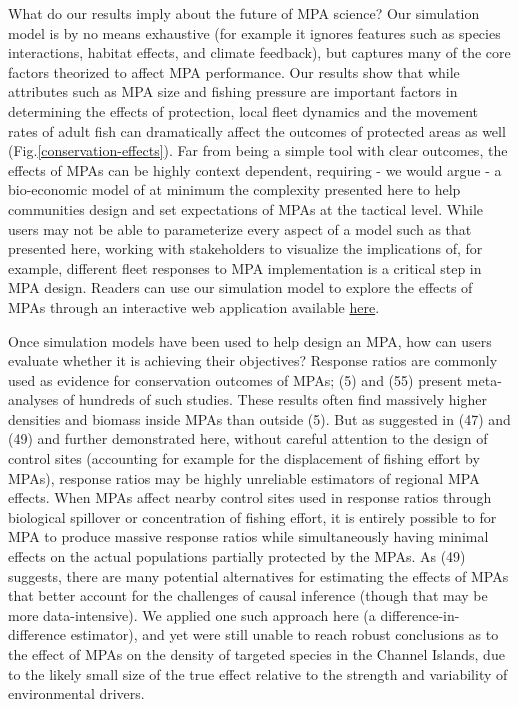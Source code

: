 \documentclass[9pt,twocolumn,twoside,lineno]{pnas-new}
\begin{document}
What do our results imply about the future of MPA science? Our
simulation model is by no means exhaustive (for example it ignores
features such as species interactions, habitat effects, and climate
feedback), but captures many of the core factors theorized to affect MPA
performance. Our results show that while attributes such as MPA size and
fishing pressure are important factors in determining the effects of
protection, local fleet dynamics and the movement rates of adult fish
can dramatically affect the outcomes of protected areas as well
(Fig.\ref{conservation-effects}). Far from being a simple tool with
clear outcomes, the effects of MPAs can be highly context dependent,
requiring - we would argue - a bio-economic model of at minimum the
complexity presented here to help communities design and set
expectations of MPAs at the tactical level. While users may not be able
to parameterize every aspect of a model such as that presented here,
working with stakeholders to visualize the implications of, for example,
different fleet responses to MPA implementation is a critical step in
MPA design. Readers can use our simulation model to explore the effects
of MPAs through an interactive web application available
\href{https://danovando.shinyapps.io/simmpa/}{here}.

Once simulation models have been used to help design an MPA, how can
users evaluate whether it is achieving their objectives? Response ratios
are commonly used as evidence for conservation outcomes of MPAs; (5) and
(55) present meta-analyses of hundreds of such studies. These results
often find massively higher densities and biomass inside MPAs than
outside (5). But as suggested in (47) and (49) and further demonstrated
here, without careful attention to the design of control sites
(accounting for example for the displacement of fishing effort by MPAs),
response ratios may be highly unreliable estimators of regional MPA
effects. When MPAs affect nearby control sites used in response ratios
through biological spillover or concentration of fishing effort, it is
entirely possible to for MPA to produce massive response ratios while
simultaneously having minimal effects on the actual populations
partially protected by the MPAs. As (49) suggests, there are many
potential alternatives for estimating the effects of MPAs that better
account for the challenges of causal inference (though that may be more
data-intensive). We applied one such approach here (a
difference-in-difference estimator), and yet were still unable to reach
robust conclusions as to the effect of MPAs on the density of targeted
species in the Channel Islands, due to the likely small size of the true
effect relative to the strength and variability of environmental
drivers.
\end{document}
